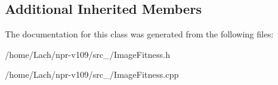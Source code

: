 \subsection*{Additional Inherited Members}


The documentation for this class was generated from the following files\+:\begin{DoxyCompactItemize}
\item 
/home/\+Lach/npr-\/v109/src\+\_/Image\+Fitness.\+h\item 
/home/\+Lach/npr-\/v109/src\+\_/Image\+Fitness.\+cpp\end{DoxyCompactItemize}
